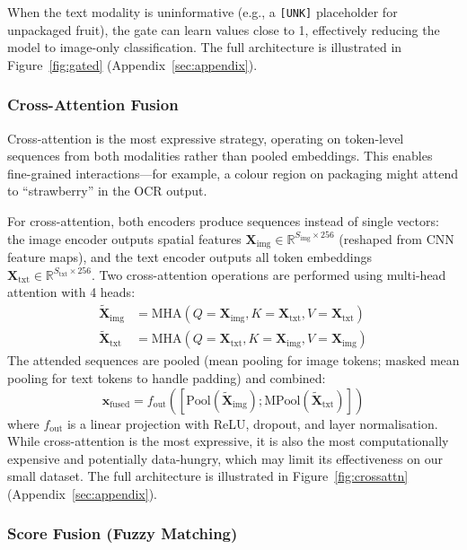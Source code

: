 \documentclass[10pt,twocolumn]{article}
\begin{document}
When the text modality is uninformative (e.g., a \texttt{[UNK]} placeholder for unpackaged fruit), the gate can learn values close to 1, effectively reducing the model to image-only classification. The full architecture is illustrated in Figure~\ref{fig:gated} (Appendix~\ref{sec:appendix}).

\subsubsection{Cross-Attention Fusion}

Cross-attention is the most expressive strategy, operating on token-level sequences from both modalities rather than pooled embeddings. This enables fine-grained interactions---for example, a colour region on packaging might attend to ``strawberry'' in the OCR output.

For cross-attention, both encoders produce sequences instead of single vectors: the image encoder outputs spatial features $\mathbf{X}_{\text{img}} \in \mathbb{R}^{S_{\text{img}} \times 256}$ (reshaped from CNN feature maps), and the text encoder outputs all token embeddings $\mathbf{X}_{\text{txt}} \in \mathbb{R}^{S_{\text{txt}} \times 256}$. Two cross-attention operations are performed using multi-head attention with 4 heads:
\begin{align}
    \tilde{\mathbf{X}}_{\text{img}} &= \text{MHA}(Q\!=\!\mathbf{X}_{\text{img}}, K\!=\!\mathbf{X}_{\text{txt}}, V\!=\!\mathbf{X}_{\text{txt}}) \\
    \tilde{\mathbf{X}}_{\text{txt}} &= \text{MHA}(Q\!=\!\mathbf{X}_{\text{txt}}, K\!=\!\mathbf{X}_{\text{img}}, V\!=\!\mathbf{X}_{\text{img}})
\end{align}
The attended sequences are pooled (mean pooling for image tokens; masked mean pooling for text tokens to handle padding) and combined:
\begin{equation}
    \mathbf{x}_{\text{fused}} = f_{\text{out}}([\text{Pool}(\tilde{\mathbf{X}}_{\text{img}}); \text{MPool}(\tilde{\mathbf{X}}_{\text{txt}})])
\end{equation}
where $f_{\text{out}}$ is a linear projection with ReLU, dropout, and layer normalisation. While cross-attention is the most expressive, it is also the most computationally expensive and potentially data-hungry, which may limit its effectiveness on our small dataset. The full architecture is illustrated in Figure~\ref{fig:crossattn} (Appendix~\ref{sec:appendix}).

\subsubsection{Score Fusion (Fuzzy Matching)}
\end{document}
